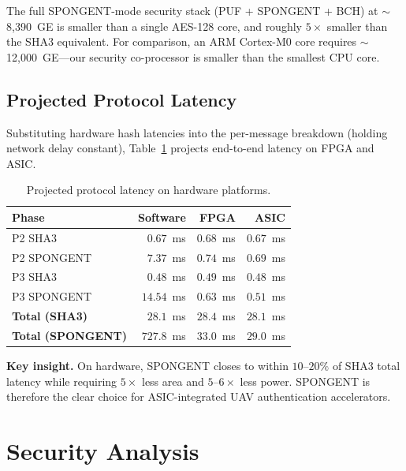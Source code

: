 \documentclass[journal,a4paper,10pt]{IEEEtran}
\begin{document}
The full SPONGENT-mode security stack (PUF + SPONGENT + BCH) at
$\sim$8{,}390~GE is smaller than a single AES-128 core, and roughly
$5\times$ smaller than the SHA3 equivalent. For comparison, an ARM
Cortex-M0 core requires $\sim$12{,}000~GE---our security
co-processor is smaller than the smallest CPU core.

\subsection{Projected Protocol Latency}
Substituting hardware hash latencies into the per-message breakdown
(holding network delay constant), Table~\ref{tab:hw_latency} projects
end-to-end latency on FPGA and ASIC.

\begin{table}[t]
\centering
\caption{Projected protocol latency on hardware platforms.}
\label{tab:hw_latency}
\begin{tabular}{@{}lrrr@{}}
\toprule
\textbf{Phase} & \textbf{Software} & \textbf{FPGA} & \textbf{ASIC} \\
\midrule
P2 SHA3                       & $0.67$~ms  & $0.68$~ms & $0.67$~ms \\
P2 SPONGENT                   & $7.37$~ms  & $0.74$~ms & $0.69$~ms \\
P3 SHA3                       & $0.48$~ms  & $0.49$~ms & $0.48$~ms \\
P3 SPONGENT                   & $14.54$~ms & $0.63$~ms & $0.51$~ms \\
\midrule
\textbf{Total (SHA3)}         & $\mathbf{28.1}$~ms & $\mathbf{28.4}$~ms & $\mathbf{28.1}$~ms \\
\textbf{Total (SPONGENT)}     & $\mathbf{727.8}$~ms & $\mathbf{33.0}$~ms & $\mathbf{29.0}$~ms \\
\bottomrule
\end{tabular}
\end{table}

\textbf{Key insight.} On hardware, SPONGENT closes to within
$10$--$20\%$ of SHA3 total latency while requiring $5\times$ less area
and $5$--$6\times$ less power. SPONGENT is therefore the clear choice
for ASIC-integrated UAV authentication accelerators.


\section{Security Analysis}
\label{sec:security}
\end{document}
